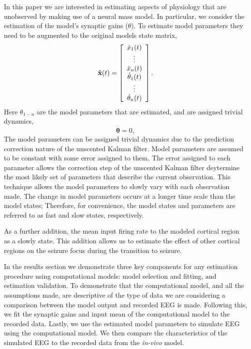 
In this paper we are interested in estimating aspects of physiology that are unobserved by making use of a neural mass model. In particular, we consider the estimation of the model's synaptic gains ($\theta$). To estimate model parameters they need to be augmented to the original models state matrix, 
\[ \mathbf{\dot{x}}(t) = \left[ \begin{array}[pos]{c}
\dot{x}_{1}(t)\\
\vdots \\
\dot{x}_{n}(t)\\
\dot{\theta}_{1}(t)\\
\vdots\\
\dot{\theta}_{n}(t) \end{array} \right] .\] Here $\theta_{1-n}$ are the model parameters that are estimated, and are assigned trivial dynamics,
\begin{equation}\label{eq: ParameterDyn}
 \mathbf{\dot{\theta}}=0,
\end{equation}
The model parameters can be assigned trivial dynamics due to the prediction correction nature of the unscented Kalman filter. Model parameters are assumed to be constant with some error assigned to them. The error assigned to each parameter allows the correction step of the unscented Kalman filter deytermine the most likely set of parameters that describe the current observation. This technique allows the model parameters to slowly vary with each observation made. The change in model parameters occurs at a longer time scale than the model states; Therefore, for convenience, the model states and parameters are referred to as fast and slow states, respectively. 

As a further addition, the mean input firing rate to the modeled cortical region as a slowly state. This addition allows us to estimate the effect of other cortical regions on the seizure focus during the transition to seizure.

In the results section we demonstrate three key components for any estimation procedure using computational models: model selection and fitting, and estimation validation. To demonstrate that the computational model, and all the assumptions made, are descriptive of the type of data we are considering a comparison between the model output and recorded EEG is made. Following this, we fit the synaptic gains and input mean of the computational model to the recorded data. Lastly, we use the estimated model parameters to simulate EEG using the computational model. We then compare the characteristics of the simulated EEG to the recorded data from the \textsl{in-vivo} model.
